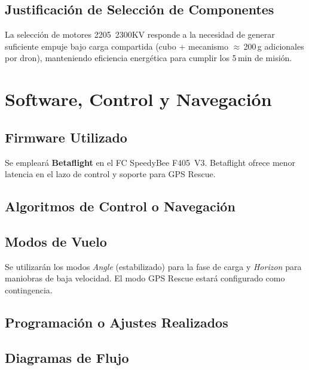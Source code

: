 \documentclass[10pt, twocolumn, letterpaper]{article}
\begin{document}
\subsection{Justificación de Selección de Componentes}
La selección de motores 2205~2300KV responde a la necesidad de generar
suficiente empuje bajo carga compartida (cubo + mecanismo $\approx$\,200\,g adicionales por dron), manteniendo eficiencia energética para cumplir los 5\,min de misión.

\section{Software, Control y Navegación}
\subsection{Firmware Utilizado}
Se empleará \textbf{Betaflight} en el FC SpeedyBee F405~V3. Betaflight ofrece menor latencia en el lazo de control y soporte para GPS Rescue.

\subsection{Algoritmos de Control o Navegación}
\noindent{}

\subsection{Modos de Vuelo}
Se utilizarán los modos \textit{Angle} (estabilizado) para la fase de carga y \textit{Horizon} para maniobras de baja velocidad. El modo GPS Rescue estará configurado como contingencia.

\subsection{Programación o Ajustes Realizados}
\noindent{}

\subsection{Diagramas de Flujo}
\noindent{}
\end{document}
